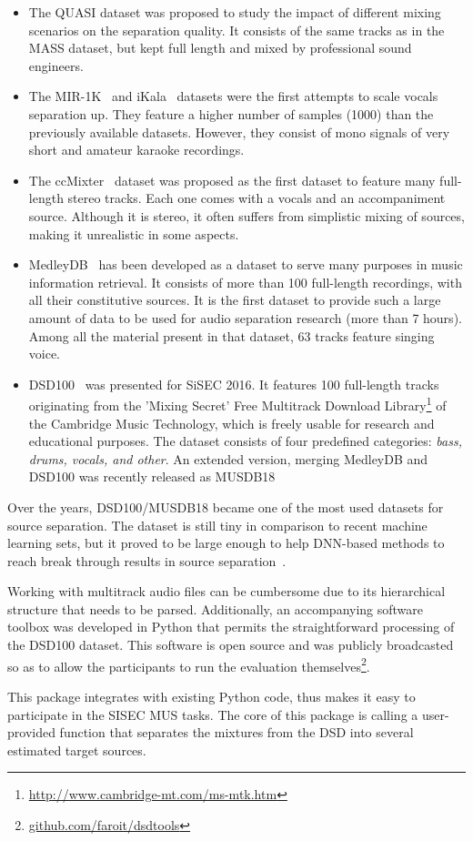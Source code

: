 \begin{itemize}[leftmargin=*]
	\item The QUASI dataset was proposed to study the impact of different mixing scenarios on the separation quality. It  consists of the same tracks as in the MASS dataset, but kept full length and mixed by professional sound engineers.
	\item The MIR-1K~\cite{hsu10} and iKala~\cite{chan15} datasets were the first attempts to scale vocals separation up. They feature a higher number of samples (1000) than the previously available datasets. However, they consist of mono signals of very short and amateur karaoke recordings.
	\item The ccMixter~\cite{liutkus142} dataset was proposed as the first dataset to feature many full-length stereo tracks. Each one comes with a vocals and an accompaniment source. Although it is stereo, it often suffers from simplistic mixing of sources, making it unrealistic in some aspects.
	\item MedleyDB~\cite{bittner14} has been developed as a dataset to serve many purposes in music information retrieval. It consists of more than 100 full-length recordings, with all their constitutive sources. It is the first dataset to provide such a large amount of data to be used for audio separation research (more than 7 hours). Among all the material present in that dataset, 63 tracks feature singing voice.
	\item DSD100~\cite{liutkus17} was presented for SiSEC 2016. It features 100 full-length tracks originating from the 'Mixing Secret' Free Multitrack Download Library\footnote{\url{http://www.cambridge-mt.com/ms-mtk.htm}} of the Cambridge Music Technology, which is freely usable for research and educational purposes.
	The dataset consists of four predefined categories: \emph{bass, drums, vocals, and other}. An extended version, merging MedleyDB and DSD100 was recently released as MUSDB18~\cite{rafii17, stoeter18sisec}
\end{itemize}

Over the years, DSD100/MUSDB18 became one of the most used datasets for source separation. 
The dataset is still tiny in comparison to recent machine learning sets, but it proved to be large enough to help DNN-based methods to reach break through results in source separation~\cite{stoeter18sisec}.
\par
Working with multitrack audio files can be cumbersome due to its hierarchical structure that needs to be parsed.
Additionally, an accompanying software toolbox was developed in Python that permits the straightforward processing of the DSD100 dataset. This software is open source and was publicly broadcasted so as to allow the participants to run the evaluation themselves\footnote{\url{github.com/faroit/dsdtools}}.
\par
This package integrates with existing Python code, thus makes it easy to participate in the SISEC MUS tasks. The core of this package is calling a user-provided function that separates the mixtures from the DSD into several estimated target sources.

